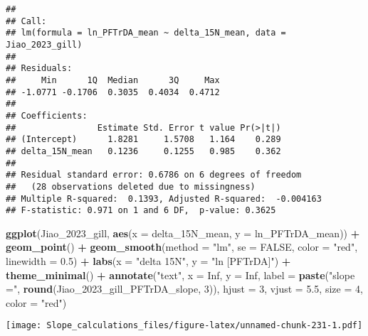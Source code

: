 \documentclass[
]{article}
\newenvironment{Shaded}{\begin{snugshade}}{\end{snugshade}}
\newcommand{\AttributeTok}[1]{\textcolor[rgb]{0.13,0.29,0.53}{#1}}
\newcommand{\ConstantTok}[1]{\textcolor[rgb]{0.56,0.35,0.01}{#1}}
\newcommand{\DecValTok}[1]{\textcolor[rgb]{0.00,0.00,0.81}{#1}}
\newcommand{\FloatTok}[1]{\textcolor[rgb]{0.00,0.00,0.81}{#1}}
\newcommand{\FunctionTok}[1]{\textcolor[rgb]{0.13,0.29,0.53}{\textbf{#1}}}
\newcommand{\NormalTok}[1]{#1}
\newcommand{\SpecialCharTok}[1]{\textcolor[rgb]{0.81,0.36,0.00}{\textbf{#1}}}
\newcommand{\StringTok}[1]{\textcolor[rgb]{0.31,0.60,0.02}{#1}}
\begin{document}
\begin{verbatim}
## 
## Call:
## lm(formula = ln_PFTrDA_mean ~ delta_15N_mean, data = Jiao_2023_gill)
## 
## Residuals:
##     Min      1Q  Median      3Q     Max 
## -1.0771 -0.1706  0.3035  0.4034  0.4712 
## 
## Coefficients:
##                Estimate Std. Error t value Pr(>|t|)
## (Intercept)      1.8281     1.5708   1.164    0.289
## delta_15N_mean   0.1236     0.1255   0.985    0.362
## 
## Residual standard error: 0.6786 on 6 degrees of freedom
##   (28 observations deleted due to missingness)
## Multiple R-squared:  0.1393, Adjusted R-squared:  -0.004163 
## F-statistic: 0.971 on 1 and 6 DF,  p-value: 0.3625
\end{verbatim}

\begin{Shaded}
\begin{Highlighting}[]
\FunctionTok{ggplot}\NormalTok{(Jiao\_2023\_gill, }\FunctionTok{aes}\NormalTok{(}\AttributeTok{x =}\NormalTok{ delta\_15N\_mean, }\AttributeTok{y =}\NormalTok{ ln\_PFTrDA\_mean)) }\SpecialCharTok{+}
  \FunctionTok{geom\_point}\NormalTok{() }\SpecialCharTok{+}
  \FunctionTok{geom\_smooth}\NormalTok{(}\AttributeTok{method =} \StringTok{"lm"}\NormalTok{, }\AttributeTok{se =} \ConstantTok{FALSE}\NormalTok{, }\AttributeTok{color =} \StringTok{"red"}\NormalTok{, }\AttributeTok{linewidth =} \FloatTok{0.5}\NormalTok{) }\SpecialCharTok{+}
  \FunctionTok{labs}\NormalTok{(}\AttributeTok{x =} \StringTok{"delta 15N"}\NormalTok{,}
       \AttributeTok{y =} \StringTok{"ln [PFTrDA]"}\NormalTok{) }\SpecialCharTok{+}
  \FunctionTok{theme\_minimal}\NormalTok{() }\SpecialCharTok{+}
  \FunctionTok{annotate}\NormalTok{(}\StringTok{"text"}\NormalTok{, }\AttributeTok{x =} \ConstantTok{Inf}\NormalTok{, }\AttributeTok{y =} \ConstantTok{Inf}\NormalTok{, }\AttributeTok{label =} \FunctionTok{paste}\NormalTok{(}\StringTok{"slope ="}\NormalTok{, }\FunctionTok{round}\NormalTok{(Jiao\_2023\_gill\_PFTrDA\_slope, }\DecValTok{3}\NormalTok{)), }
           \AttributeTok{hjust =} \DecValTok{3}\NormalTok{, }\AttributeTok{vjust =} \FloatTok{5.5}\NormalTok{, }\AttributeTok{size =} \DecValTok{4}\NormalTok{, }\AttributeTok{color =} \StringTok{"red"}\NormalTok{)}
\end{Highlighting}
\end{Shaded}

\texttt{[image: Slope\_calculations\_files/figure-latex/unnamed-chunk-231-1.pdf]}
\end{document}
